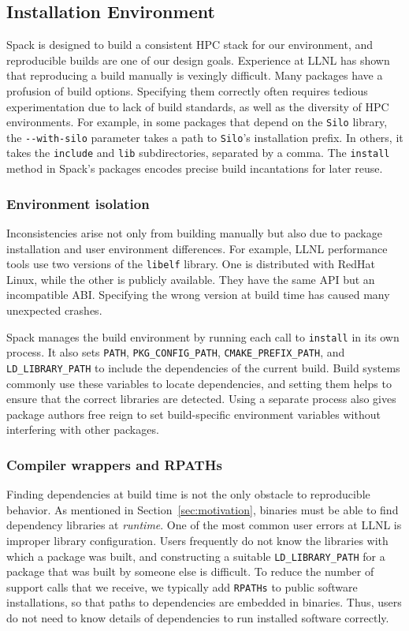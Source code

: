 
\subsection{Installation Environment}

Spack is designed to build a consistent HPC stack for our
environment, and reproducible builds are one of our design goals.
Experience at LLNL has shown that reproducing a build manually
is vexingly difficult.
%
Many packages have a profusion of build options. Specifying
them correctly often requires tedious experimentation due to lack of
build standards, as well as the diversity of HPC environments.
For example, in some packages that depend on the {\tt Silo} library,
the \verb|--with-silo| parameter takes a path to {\tt Silo}'s installation 
prefix. In others, it takes the {\tt include} and {\tt lib} subdirectories,
separated by a comma.
The {\tt install} method in Spack's packages encodes precise build
incantations for later reuse.

\subsubsection{Environment isolation}
Inconsistencies arise not only from building manually but also due to 
package installation and user environment differences.
%
For example, LLNL performance tools use two versions of the {\tt libelf}
library. One is distributed with RedHat Linux, while the
other is publicly available. They have the same API but an incompatible ABI.
Specifying the wrong version at build time has caused many
unexpected crashes.

Spack manages the build environment by running each call to {\tt install}
in its own process.  It also sets
{\tt PATH}, {\tt PKG\_CONFIG\_PATH}, {\tt CMAKE\_PREFIX\_PATH}, and
{\tt LD\_LIBRARY\_PATH} to include the dependencies of the current build.
Build systems commonly use these variables to locate dependencies,
and setting them helps to ensure that the correct libraries are detected.
Using a separate process also gives package authors
free reign to set build-specific environment variables without interfering
with other packages.

\subsubsection{Compiler wrappers and RPATHs}
Finding dependencies at build time is not the only obstacle to reproducible
behavior.  As mentioned in Section~\ref{sec:motivation}, binaries must be 
able to find dependency libraries at {\it runtime}.
One of the most common user errors at LLNL is improper library configuration.
Users frequently do not know the libraries with which a package was built, and
constructing a suitable {\tt LD\_LIBRARY\_PATH} for a package that was built 
by someone else is difficult. To reduce the number of support calls that we 
receive, we typically add {\tt RPATHs} to public software installations, so 
that paths to dependencies are embedded in binaries. Thus, users do not need 
to know details of dependencies to run installed software correctly.

